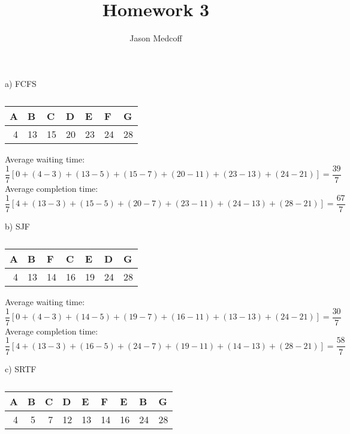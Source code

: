\documentclass{amsart}
\title{Homework 3}
\author{Jason Medcoff}
\date{}
\begin{document}
	\maketitle
	
	
	a) FCFS
	\begin{table}[h]
		\centering
		\caption{}
		\label{1}
		\begin{tabular}{rrrrrrr}
			\hline
			\multicolumn{1}{|l|}{A} & \multicolumn{1}{l|}{B} & \multicolumn{1}{l|}{C} & \multicolumn{1}{l|}{D} & \multicolumn{1}{l|}{E} & \multicolumn{1}{l|}{F} & \multicolumn{1}{l|}{G} \\ \hline
			4                       & 13                     & 15                     & 20                     & 23                     & 24                     & 28                    
		\end{tabular}
	\end{table}
	
	Average waiting time: $$ \frac{1}{7}[0 + (4-3) + (13-5) + (15-7) + (20-11) + (23-13) + (24-21)] = \frac{39}{7}$$
	Average completion time:
	$$ \frac{1}{7}[4 + (13-3) + (15-5) + (20-7) + (23-11) + (24-13) + (28-21)] = \frac{67}{7} $$
	
	b) SJF
	\begin{table}[h]
		\centering
		\caption{}
		\label{2}
		\begin{tabular}{rrrrrrr}
			\hline
			\multicolumn{1}{|l|}{A} & \multicolumn{1}{l|}{B} & \multicolumn{1}{l|}{F} & \multicolumn{1}{l|}{C} & \multicolumn{1}{l|}{E} & \multicolumn{1}{l|}{D} & \multicolumn{1}{l|}{G} \\ \hline
			4                       & 13                      & 14                      & 16                     & 19                      & 24                      & 28                     
		\end{tabular}
	\end{table}
	
	Average waiting time: 
	$$ \frac{1}{7}[0 + (4-3) + (14-5) + (19-7) + (16-11) + (13-13) + (24-21)] = \frac{30}{7}$$
	Average completion time:
	$$ \frac{1}{7}[4 + (13-3) + (16-5) + (24-7) + (19-11) + (14-13) + (28-21)] = \frac{58}{7} $$
	
	c) SRTF
	\begin{table}[h]
		\centering
		\caption{}
		\label{3}
		\begin{tabular}{rrrrrrrrr}
			\hline
			\multicolumn{1}{|l|}{A} & \multicolumn{1}{l|}{B} & \multicolumn{1}{l|}{C} & \multicolumn{1}{l|}{D} & \multicolumn{1}{l|}{E} & \multicolumn{1}{l|}{F} & \multicolumn{1}{l|}{E} & \multicolumn{1}{l|}{B} & \multicolumn{1}{l|}{G} \\ \hline
			4                       & 5                      & 7                      & 12                     & 13                     & 14                     & 16                     & 24                     & 28                    
		\end{tabular}
	\end{table}
	
\end{document}
